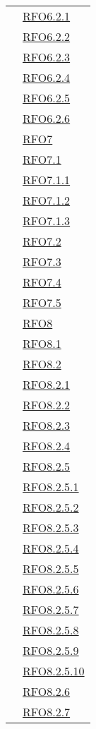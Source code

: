\begin{longtable}{|>{\centering}m{5cm}|m{5cm}<{\centering}|}
& \hyperlink{RFO6.2.1}{RFO6.2.1}\\
& \hyperlink{RFO6.2.2}{RFO6.2.2}\\
& \hyperlink{RFO6.2.3}{RFO6.2.3}\\
& \hyperlink{RFO6.2.4}{RFO6.2.4}\\
& \hyperlink{RFO6.2.5}{RFO6.2.5}\\
& \hyperlink{RFO6.2.6}{RFO6.2.6}\\
& \hyperlink{RFO7}{RFO7}\\
& \hyperlink{RFO7.1}{RFO7.1}\\
& \hyperlink{RFO7.1.1}{RFO7.1.1}\\
& \hyperlink{RFO7.1.2}{RFO7.1.2}\\
& \hyperlink{RFO7.1.3}{RFO7.1.3}\\
& \hyperlink{RFO7.2}{RFO7.2}\\
& \hyperlink{RFO7.3}{RFO7.3}\\
& \hyperlink{RFO7.4}{RFO7.4}\\
& \hyperlink{RFO7.5}{RFO7.5}\\
& \hyperlink{RFO8}{RFO8}\\
& \hyperlink{RFO8.1}{RFO8.1}\\
& \hyperlink{RFO8.2}{RFO8.2}\\
& \hyperlink{RFO8.2.1}{RFO8.2.1}\\
& \hyperlink{RFO8.2.2}{RFO8.2.2}\\
& \hyperlink{RFO8.2.3}{RFO8.2.3}\\
& \hyperlink{RFO8.2.4}{RFO8.2.4}\\
& \hyperlink{RFO8.2.5}{RFO8.2.5}\\
& \hyperlink{RFO8.2.5.1}{RFO8.2.5.1}\\
& \hyperlink{RFO8.2.5.2}{RFO8.2.5.2}\\
& \hyperlink{RFO8.2.5.3}{RFO8.2.5.3}\\
& \hyperlink{RFO8.2.5.4}{RFO8.2.5.4}\\
& \hyperlink{RFO8.2.5.5}{RFO8.2.5.5}\\
& \hyperlink{RFO8.2.5.6}{RFO8.2.5.6}\\
& \hyperlink{RFO8.2.5.7}{RFO8.2.5.7}\\
& \hyperlink{RFO8.2.5.8}{RFO8.2.5.8}\\
& \hyperlink{RFO8.2.5.9}{RFO8.2.5.9}\\
& \hyperlink{RFO8.2.5.10}{RFO8.2.5.10}\\
& \hyperlink{RFO8.2.6}{RFO8.2.6}\\
& \hyperlink{RFO8.2.7}{RFO8.2.7}\\

\end{longtable}
